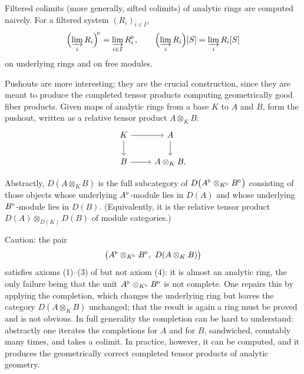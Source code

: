 \begin{proposition}
\label{prop:1:filtered-colimits}
Filtered colimits (more generally, sifted colimits) of analytic rings are
computed naively. For a filtered system $(R_i)_{i\in I}$,
\begin{equation*}
\Bigl(\varinjlim_i R_i\Bigr)^{\!\triangleright}=\varinjlim_{i\in I}R_i^{\triangleright},
\qquad
\Bigl(\varinjlim_i R_i\Bigr)[S]=\varinjlim_i R_i[S]
\end{equation*}
on underlying rings and on free modules.
\end{proposition}

Pushouts are more interesting; they are the crucial construction, since they are
meant to produce the completed tensor products computing geometrically good fiber
products. Given maps of analytic rings from a base $K$ to $A$ and $B$, form the
pushout, written as a relative tensor product $A\otimes_K B$:
\[
\begin{tikzcd}
K \arrow[r] \arrow[d] & A \arrow[d] \\
B \arrow[r] & A\otimes_K B.
\end{tikzcd}
\]

\begin{proposition}
\label{prop:1:pushout-derived-category}
Abstractly, $D(A\otimes_K B)$ is the full subcategory of
$D\bigl(A^{\triangleright}\otimes_{K^{\triangleright}}B^{\triangleright}\bigr)$ consisting of those objects whose
underlying $A^{\triangleright}$-module lies in $D(A)$ and whose underlying $B^{\triangleright}$-module
lies in $D(B)$. (Equivalently, it is the relative tensor product
$D(A)\otimes_{D(K)} D(B)$ of module categories.)
\end{proposition}

\begin{remark}
\label{rmk:1:pushout-completion}
Caution: the pair
\begin{equation}
\label{eq:1:pushout-not-analytic}
\bigl(A^{\triangleright}\otimes_{K^{\triangleright}}B^{\triangleright},\ D(A\otimes_K B)\bigr)
\end{equation}
satisfies axioms (1)--(3) of  but not axiom (4): it is
almost an analytic ring, the only failure being that the unit
$A^{\triangleright}\otimes_{K^{\triangleright}}B^{\triangleright}$ is not complete. One repairs this by applying the
completion, which changes the underlying ring but leaves the category $D(A\otimes_K B)$
unchanged; that the result is again a ring must be proved and is not obvious. In
full generality the completion can be hard to understand: abstractly one iterates
the completions for $A$ and for $B$, sandwiched, countably many times, and takes a
colimit. In practice, however, it can be computed, and it produces the
geometrically correct completed tensor products of analytic geometry.
\end{remark}

